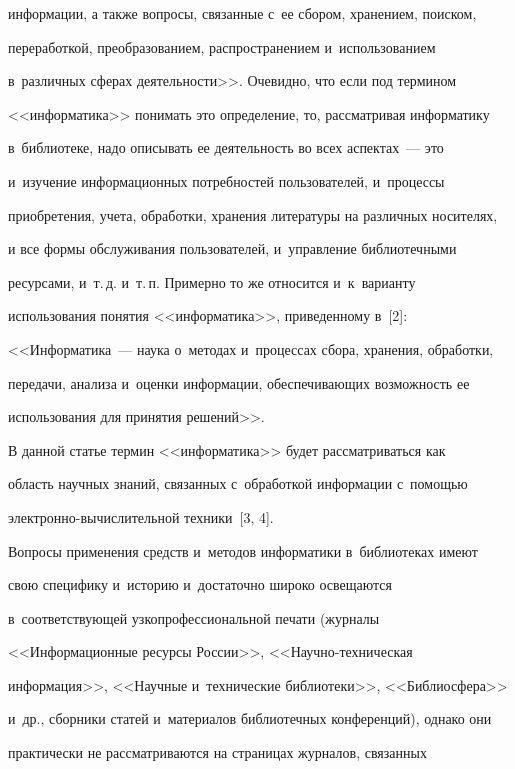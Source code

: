 информации, а также вопросы, связанные с~ее сбором, хранением, поиском, 


переработкой, преобразованием, распространением и~использованием 


в~различных сферах деятельности>>. Очевидно, что если под термином 


<<информатика>> понимать это определение, то, рассматривая информатику 


в~библиотеке, надо описывать ее деятельность во всех аспектах~--- это 


и~изучение информационных потребностей пользователей, и~процессы 


приобретения, учета, обработки, хранения литературы на различных носителях, 


и все формы обслуживания пользователей, и~управление библиотечными 


ресурсами, и~т.\,д. и~т.\,п. Примерно то же относится и~к~варианту 


использования понятия <<информатика>>, приведенному в~[2]: 


<<Информатика~--- наука о~методах и~процессах сбора, хранения, обработки, 


передачи, анализа и~оценки информации, обеспечивающих возможность ее 


использования для принятия решений>>. 


  


  В данной статье термин <<информатика>> будет рассматриваться как 


область научных знаний, связанных с~обработкой информации с~помощью  


элект\-рон\-но-вы\-чис\-ли\-тель\-ной техники~[3, 4]. 


  


  Вопросы применения средств и~методов информатики в~библиотеках имеют 


свою специфику и~историю и~достаточно широко освещаются 


в~соответствующей узкопрофессиональной печати (журналы 


<<Информационные ресурсы России>>, <<На\-уч\-но-тех\-ни\-че\-ская 


информация>>, <<Научные и~технические библиотеки>>, <<Библиосфера>> 


и~др., сборники статей и~материалов библиотечных конференций), однако они 


практически не рассматриваются на страницах журналов, связанных 


